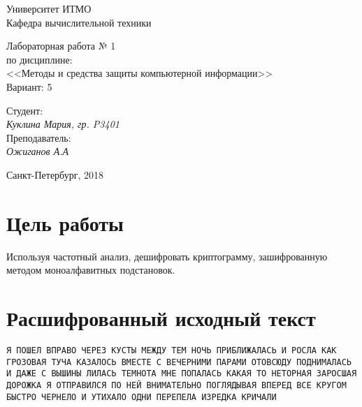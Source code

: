 \documentclass[12pt, a4paper] {ncc}
\begin{document}
\setcounter{figure}{0}
\frenchspacing
\pagestyle{empty}
\begin{center}
                            Университет ИТМО    \\
                        Кафедра вычислительной техники

						Лабораторная работа № 1 \\
				по дисциплине: \\
				<<Методы и средства защиты компьютерной информации>>\\
Вариант: 5
\end{center}
\begin{center}

\end{center}
\begin{flushright}
                                    Студент:\\
                                    {\it Куклина Мария, гр. P3401}\\
                                    Преподаватель: \\
                                    {\it Ожиганов А.А}
\end{flushright}
\begin{center}
                             Санкт-Петербург, 2018
\end{center}
\newpage

\section{Цель работы}

Используя частотный анализ, дешифровать криптограмму, зашифрованную методом
моноалфавитных подстановок.

\section{Расшифрованный исходный текст}

    \texttt{Я ПОШЕЛ ВПРАВО ЧЕРЕЗ КУСТЫ МЕЖДУ ТЕМ НОЧЬ ПРИБЛИЖАЛАСЬ И
			РОСЛА КАК ГРОЗОВАЯ ТУЧА КАЗАЛОСЬ ВМЕСТЕ С ВЕЧЕРНИМИ ПАРАМИ
			ОТОВСЮДУ ПОДНИМАЛАСЬ И ДАЖЕ С ВЫШИНЫ ЛИЛАСЬ ТЕМНОТА МНЕ 
			ПОПАЛАСЬ КАКАЯ ТО НЕТОРНАЯ ЗАРОСШАЯ ДОРОЖКА Я ОТПРАВИЛСЯ 
			ПО НЕЙ ВНИМАТЕЛЬНО ПОГЛЯДЫВАЯ ВПЕРЕД ВСЕ КРУГОМ БЫСТРО 
			ЧЕРНЕЛО И УТИХАЛО ОДНИ ПЕРЕПЕЛА ИЗРЕДКА КРИЧАЛИ}
\end{document}
